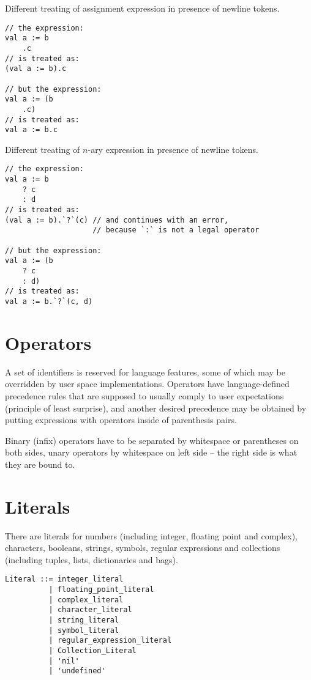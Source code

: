 \example Different treating of assignment expression in presence of newline tokens. 
\begin{lstlisting}
// the expression:
val a := b
    .c
// is treated as:
(val a := b).c

// but the expression:
val a := (b
    .c)
// is treated as:
val a := b.c 
\end{lstlisting}

\example Different treating of $n$-ary expression in presence of newline tokens.
\begin{lstlisting}
// the expression:
val a := b
    ? c
    : d
// is treated as:
(val a := b).`?`(c) // and continues with an error,
                    // because `:` is not a legal operator

// but the expression:
val a := (b
    ? c
    : d)
// is treated as:
val a := b.`?`(c, d) 
\end{lstlisting}






\section{Operators}\label{sec:operators}
A set of identifiers is reserved for language features, some of which may be overridden by user space implementations. Operators have language-defined precedence rules that are supposed to usually comply to user expectations (principle of least surprise), and another desired precedence may be obtained by putting expressions with operators inside of parenthesis pairs. 

Binary (infix) operators have to be separated by whitespace or parentheses on both sides, unary operators by whitespace on left side -- the right side is what they are bound to. 






\section{Literals}\label{sec:literals}

There are literals for numbers (including integer, floating point and complex), characters, booleans, strings, symbols, regular expressions and collections (including tuples, lists, dictionaries and bags). 

\syntax\begin{lstlisting}
Literal ::= integer_literal
	      | floating_point_literal
	      | complex_literal
	      | character_literal
	      | string_literal
	      | symbol_literal
	      | regular_expression_literal
	      | Collection_Literal
	      | 'nil'
	      | 'undefined'
\end{lstlisting}






